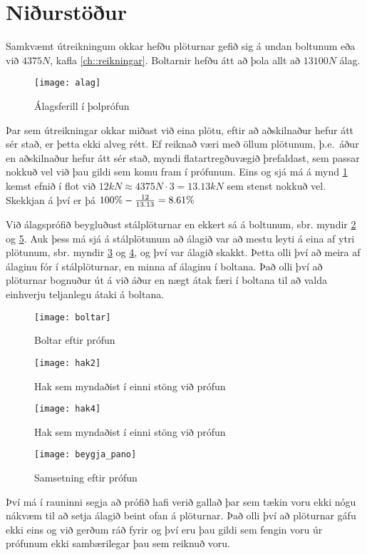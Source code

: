 
\section{Niðurstöður}
\label{sec:nidurstodur}

Samkvæmt útreikningum okkar hefðu plöturnar gefið sig á undan boltunum eða við $4375 N$, \sbr kafla \ref{ch::reikningar}.
Boltarnir hefðu átt að þola allt að $13100 N$ álag.

\begin{figure}[h]
  \centering
  \texttt{[image: alag]}
  \caption{Álagsferill í þolprófun}
  \label{fig:alag}
\end{figure}

Þar sem útreikningar okkar miðast við eina plötu, \te eftir að aðskilnaður hefur átt sér stað, er þetta ekki alveg rétt.
Ef reiknað væri með öllum plötunum, þ.e.~áður en aðskilnaður hefur átt sér stað, myndi flatartregðuvægið þrefaldast, sem passar nokkuð vel við þau gildi sem komu fram í prófunum.
Eins og sjá má á mynd \ref{fig:alag} kemst efnið í flot við \(12 kN \approx 4375 N \cdot 3 = 13.13 kN\) sem stenst nokkuð vel.
Skekkjan á því er þá \(100\% - {12 \over 13.13} = 8.61\% \)

Við álagsprófið beygluðust stálplöturnar en ekkert sá á boltunum, sbr. myndir \ref{fig:boltar} og \ref{fig:pano}.
Auk þess má sjá á stálplötunum að álagið var að mestu leyti á eina af ytri plötunum, sbr. myndir \ref{fig:hak2} og \ref{fig:hak4}, og því var álagið skakkt. Þetta olli því að meira af álaginu fór í stálplöturnar, en minna af álaginu í boltana.
Það olli því að plöturnar bognuður út á við áður en nægt átak færi í boltana til að valda einhverju teljanlegu átaki á boltana.

\clearpage

\begin{figure}
  \centering
  \texttt{[image: boltar]}
  \caption{Boltar eftir prófun}
  \label{fig:boltar}
\end{figure}


\begin{figure}
  \centering
  \texttt{[image: hak2]}
  \caption{Hak sem myndaðist í einni stöng við prófun}
  \label{fig:hak2}
\end{figure}

\begin{figure}
  \centering
  \texttt{[image: hak4]}
  \caption{Hak sem myndaðist í einni stöng við prófun}
  \label{fig:hak4}
\end{figure}


\clearpage

\begin{figure}
  \centering
  \texttt{[image: beygja\_pano]}
  \caption{Samsetning eftir prófun}
  \label{fig:pano}
\end{figure}


Því má í rauninni segja að prófið hafi verið gallað þar sem tækin voru ekki nógu nákvæm til að setja álagið beint ofan á plöturnar. Það olli því að plöturnar gáfu ekki eins og við gerðum ráð fyrir og því eru þau gildi sem fengin voru úr prófunum ekki sambærilegar þau sem reiknuð voru.
